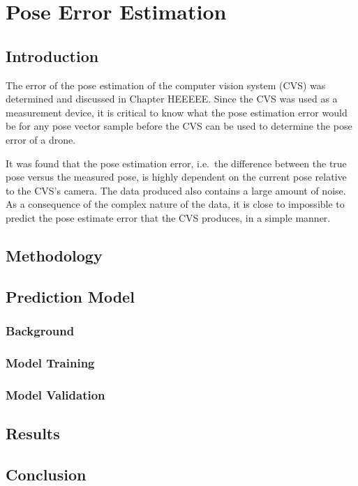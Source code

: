 \chapter{Pose Error Estimation}

\section{Introduction}

The error of the pose estimation of the computer vision system (CVS) was determined and discussed in Chapter HEEEEE\@. Since the CVS was used as a measurement device, it is critical to know what the pose estimation error would be for any pose vector sample before the CVS can be used to determine the pose error of a drone. 

It was found that the pose estimation error, i.e.\ the difference between the true pose versus the measured pose, is highly dependent on the current pose relative to the CVS's camera. The data produced also contains a large amount of noise. As a consequence of the complex nature of the data, it is close to impossible to predict the pose estimate error that the CVS produces, in a simple manner. 

\section{Methodology}

\section{Prediction Model}

\subsection{Background}

\subsection{Model Training}

\subsection{Model Validation}

\section{Results}

\section{Conclusion}
